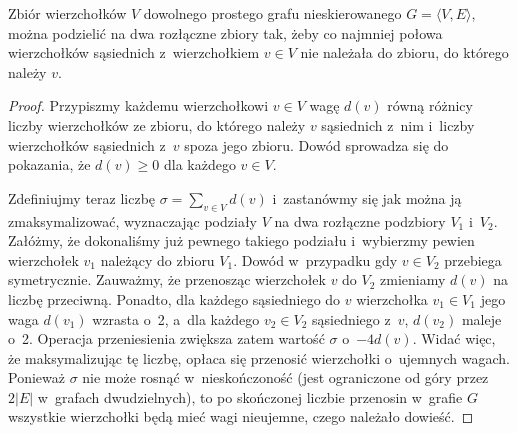 \subproblem %
\begin{twierdzenie}
	Zbiór wierzchołków $V$ dowolnego prostego grafu nieskierowanego $G=\langle V,E\rangle$, można podzielić na dwa rozłączne zbiory tak, żeby co najmniej połowa wierzchołków sąsiednich z~wierzchołkiem $v\in V$ nie należała do zbioru, do którego należy $v$.
\end{twierdzenie}
\begin{proof}
Przypiszmy każdemu wierzchołkowi $v\in V$ wagę $d(v)$ równą różnicy liczby wierzchołków ze zbioru, do którego należy $v$ sąsiednich z~nim i~liczby wierzchołków sąsiednich z~$v$ spoza jego zbioru. Dowód sprowadza się do pokazania, że $d(v)\ge0$ dla każdego $v\in V$\!.

Zdefiniujmy teraz liczbę $\sigma=\sum_{v\in V}d(v)$ i~zastanówmy się jak można ją zmaksymalizować, wyznaczając podziały $V$ na dwa rozłączne podzbiory $V_1$ i~$V_2$. Załóżmy, że dokonaliśmy już pewnego takiego podziału i~wybierzmy pewien wierzchołek $v_1$ należący do zbioru $V_1$. Dowód w~przypadku gdy $v\in V_2$ przebiega symetrycznie. Zauważmy, że przenosząc wierzchołek $v$ do $V_2$ zmieniamy $d(v)$ na liczbę przeciwną. Ponadto, dla każdego sąsiedniego do $v$ wierzchołka $v_1\in V_1$ jego waga $d(v_1)$ wzrasta o~2, a~dla każdego $v_2\in V_2$ sąsiedniego z~$v$, $d(v_2)$ maleje o~2. Operacja przeniesienia zwiększa zatem wartość $\sigma$ o~$-4d(v)$. Widać więc, że maksymalizując tę liczbę, opłaca się przenosić wierzchołki o~ujemnych wagach. Ponieważ $\sigma$ nie może rosnąć w~nieskończoność (jest ograniczone od góry przez $2|E|$ w~grafach dwudzielnych), to po skończonej liczbie przenosin w~grafie $G$ wszystkie wierzchołki będą mieć wagi nieujemne, czego należało dowieść.
\end{proof}

